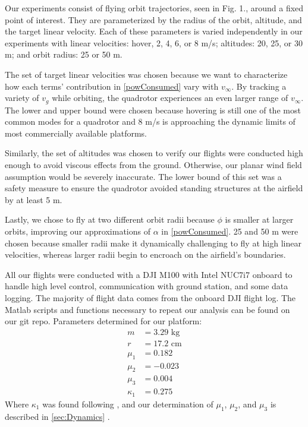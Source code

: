 
Our experiments consist of flying orbit trajectories, seen in Fig. 1., around a fixed point of interest. They are parameterized by the radius of the orbit, altitude, and the target linear velocity.  Each of these parameters is varied independently in our experiments with linear velocities: hover, 2, 4, 6, or 8 m/s; altitudes: 20, 25, or 30 m; and orbit radius: 25 or 50 m. 

The set of target linear velocities was chosen because we want to characterize how each terms' contribution in \eqref{powConsumed} vary with $v_\infty$. By tracking a variety of $v_g$ while orbiting, the quadrotor experiences an even larger range of $v_\infty$. The lower and upper bound were chosen because hovering is still one of the most common modes for a quadrotor and 8 m/s is approaching the dynamic limits of most commercially available platforms.

Similarly, the set of altitudes was chosen to verify our flights were conducted high enough to avoid viscous effects from the ground. Otherwise, our planar wind field assumption would be severely inaccurate. The lower bound of this set was a safety measure to ensure the quadrotor avoided standing structures at the airfield by at least 5 m.

Lastly, we chose to fly at two different orbit radii because $\phi$ is smaller at larger orbits, improving our approximations of $\alpha$ in \eqref{powConsumed}. 25 and 50 m were chosen because smaller radii make it dynamically challenging to fly at high linear velocities, whereas larger radii begin to encroach on the airfield's boundaries.  


All our flights were conducted with a DJI M100 with Intel NUC7i7 onboard to handle high level control, communication with ground station, and some data logging. The majority of flight data comes from the onboard DJI flight log. The Matlab scripts and functions necessary to repeat our analysis can be found on our git repo. Parameters determined for our platform:
\begin{align*}
	m &= 3.29 \text{ kg} \\
	r &= 17.2 \text{ cm} \\
	\mu_1 &= 0.182 \\
	\mu_2 &= -0.023 \\
	\mu_3 &= 0.004 \\
	\kappa_1 &= 0.275 
\end{align*}
Where $\kappa_1$ was found following \cite{liu2017power}, and our determination of $\mu_1$, $\mu_2$, and $\mu_3$ is described in \ref{sec:Dynamics} .


